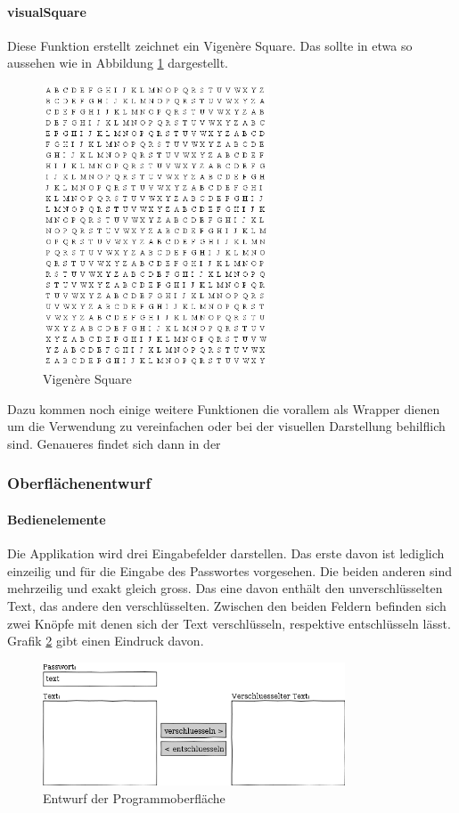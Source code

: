 \documentclass[11pt,paper=a4,final]{scrartcl}
\begin{document}
\paragraph{visualSquare}
Diese Funktion erstellt zeichnet ein Vigen\`ere Square. Das sollte in etwa so
aussehen wie in Abbildung \ref{fig:square} \glqq {} \grqq
dargestellt.
\begin{figure}[h!]
  \centering
  \includegraphics[width=0.6\textwidth]{square.png}
  \caption{Vigen\`ere Square}
  \label{fig:square}
\end{figure}

Dazu kommen noch einige weitere Funktionen die vorallem als Wrapper dienen um
die Verwendung zu vereinfachen oder bei der visuellen Darstellung behilflich
sind. Genaueres findet sich dann in der %
\subsubsection{Oberfl\"achenentwurf}
\paragraph{Bedienelemente}
Die Applikation wird drei Eingabefelder darstellen. Das erste davon ist
lediglich einzeilig und f\"ur die Eingabe des Passwortes vorgesehen. Die beiden
anderen sind mehrzeilig und exakt gleich gross. Das eine davon enth\"alt den
unverschl\"usselten Text, das andere den verschl\"usselten. Zwischen den beiden
Feldern befinden sich zwei Kn\"opfe mit denen sich der Text verschl\"usseln,
respektive entschl\"usseln l\"asst. Grafik \ref{fig:interface} \glqq
{} \grqq gibt einen Eindruck davon.
\begin{figure}[h!]
  \centering
  \includegraphics[width=0.8\textwidth]{interface.png}
  \caption{Entwurf der Programmoberfl\"ache}
  \label{fig:interface}
\end{figure}
\end{document}
